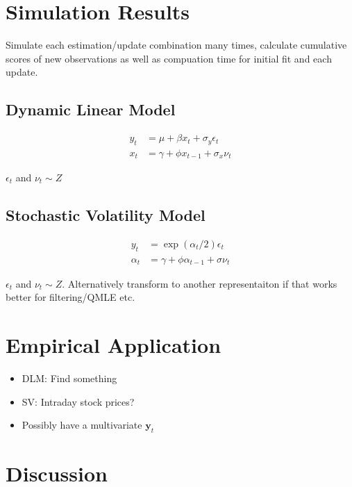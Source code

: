 \documentclass[12pt,a4paper]{article}%
\numberwithin{equation}{section}
\begin{document}
\section{Simulation Results}

Simulate each estimation/update combination many times, calculate cumulative scores of new observations as well as compuation time for initial fit and each update.

\subsection{Dynamic Linear Model}

\begin{align}
y_t &= \mu + \beta x_t + \sigma_y \epsilon_t \\
x_t &= \gamma + \phi x_{t-1} + \sigma_x \nu_t
\end{align}

$\epsilon_t$ and $\nu_t \sim Z$

\subsection{Stochastic Volatility Model}

\begin{align}
y_t &= \exp\left(\alpha_t/2\right) \epsilon_t \\
\alpha_t &= \gamma + \phi \alpha_{t-1} + \sigma \nu_t
\end{align}

$\epsilon_t$ and $\nu_t \sim Z$.
Alternatively transform to another representaiton if that works better for filtering/QMLE etc.

\section{Empirical Application}
\begin{itemize}
\item DLM: Find something
\item SV: Intraday stock prices? 
\item Possibly have a multivariate $\textbf{y}_t$
\end{itemize}




\section{Discussion}
\end{document}
